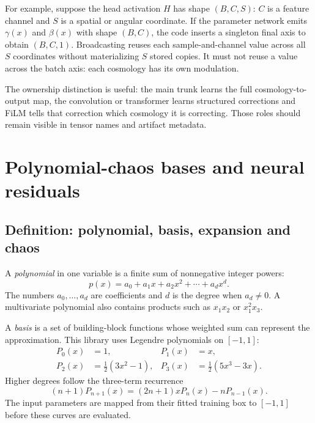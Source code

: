 \documentclass[10pt,aps,prd,twocolumn,nofootinbib]{revtex4-2}
\begin{document}
For example, suppose the head activation $H$ has shape $(B,C,S)$: $C$ is a
feature channel and $S$ is a spatial or angular coordinate.  If the parameter
network emits $\gamma(x)$ and $\beta(x)$ with shape $(B,C)$, the code inserts
a singleton final axis to obtain $(B,C,1)$.  Broadcasting reuses each
sample-and-channel value across all $S$ coordinates without materializing
$S$ stored copies.  It must not reuse a value across the batch axis: each
cosmology has its own modulation.

The ownership distinction is useful: the main trunk learns the full
cosmology-to-output map, the convolution or transformer learns structured
corrections and FiLM tells that correction which cosmology it is correcting.
Those roles should remain visible in tensor names and artifact metadata.

\section{Polynomial-chaos bases and neural residuals}
\label{sec:pce}

\subsection{Definition: polynomial, basis, expansion and chaos}

A \emph{polynomial} in one variable is a finite sum of nonnegative integer
powers:
\begin{equation*}
 p(x)=a_0+a_1x+a_2x^2+\cdots+a_dx^d.
\end{equation*}
The numbers \(a_0,\ldots,a_d\) are coefficients and \(d\) is the degree when
\(a_d\ne0\).  A multivariate polynomial also contains products such as
\(x_1x_2\) or \(x_1^2x_3\).

A \emph{basis} is a set of building-block functions whose weighted sum can
represent the approximation.  This library uses Legendre polynomials on
\([-1,1]\):
\begin{align*}
 P_0(x)&=1,&
 P_1(x)&=x,\\
 P_2(x)&=\tfrac12(3x^2-1),&
 P_3(x)&=\tfrac12(5x^3-3x).
\end{align*}
Higher degrees follow the three-term recurrence
\begin{equation*}
 (n+1)P_{n+1}(x)
 =(2n+1)xP_n(x)-nP_{n-1}(x).
\end{equation*}
The input parameters are mapped from their fitted training box to
\([-1,1]\) before these curves are evaluated.
\end{document}
